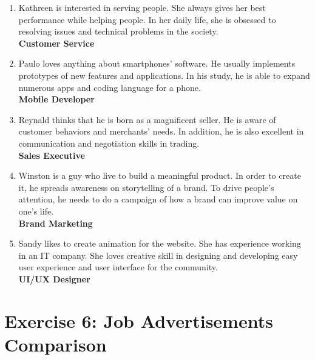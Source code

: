 \documentclass[12pt,titlepage]{article}
\begin{document}
\begin{enumerate}
    \item {
        Kathreen is interested in serving people. She always gives her best
        performance while helping people. In her daily life, she is obsessed
        to resolving issues and technical problems in the society.\\
        \textbf{Customer Service}
    } 
    \item {
        Paulo loves anything about smartphones’ software. He usually
        implements prototypes of new features and applications. In his
        study, he is able to expand numerous apps and coding language
        for a phone.\\
        \textbf{Mobile Developer}
    } 
    \item {
        Reynald thinks that he is born as a magnificent seller. He is aware of
        customer behaviors and merchants’ needs. In addition, he is also
        excellent in communication and negotiation skills in trading.\\
        \textbf{Sales Executive}
    }
    \item {
        Winston is a guy who live to build a meaningful product. In order
        to create it, he spreads awareness on storytelling of a brand. To
        drive people’s attention, he needs to do a campaign of how a
        brand can improve value on one’s life.\\
        \textbf{Brand Marketing}
    }
    \item {
        Sandy likes to create animation for the website. She has experience
        working in an IT company. She loves creative skill in designing and
        developing easy user experience and user interface for the
        community.\\
        \textbf{UI/UX Designer}
    }
\end{enumerate}

\pagebreak

\section{Exercise 6: Job Advertisements Comparison}
\end{document}
